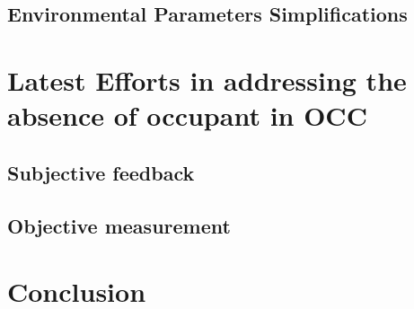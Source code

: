 \documentclass[review]{elsarticle}
\begin{document}
    \subsection{Environmental Parameters Simplifications}
    
%         
%         
\section{Latest Efforts in addressing the absence of occupant in OCC}
    \subsection{Subjective feedback}
    
    \subsection{Objective measurement}
    
\section{Conclusion}


\end{document}

